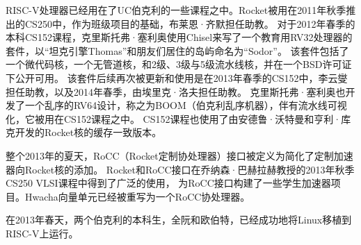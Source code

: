 RISC-V处理器已经用在了UC伯克利的一些课程之中。Rocket被用在2011年秋季推出的CS250中，作为班级项目的基础，布莱恩·齐默担任助教。
对于2012年春季的本科CS152课程，克里斯托弗·塞利奥使用Chisel来写了一个教育用RV32处理器的套件，以“坦克引擎Thomas”和朋友们居住的岛屿命名为“Sodor”。
该套件包括了一个微代码核，一个无管道核，和2级、3级与5级流水线核，并在一个BSD许可证下公开可用。
该套件后续再次被更新和使用是在2013年春季的CS152中，李云燮担任助教，以及2014年春季，由埃里克·洛夫担任助教。
克里斯托弗·塞利奥也开发了一个乱序的RV64设计，称之为BOOM（伯克利乱序机器），伴有流水线可视化，它被用在CS152课程之中。
CS152课程也使用了由安德鲁·沃特曼和亨利·库克开发的Rocket核的缓存一致版本。

整个2013年的夏天，RoCC（Rocket定制协处理器）接口被定义为简化了定制加速器向Rocket核的添加。
Rocket和RoCC接口在乔纳森·巴赫拉赫教授的2013年秋季CS250 VLSI课程中得到了广泛的使用，
为RoCC接口构建了一些学生加速器项目。Hwacha向量单元已经被重写为一个RoCC协处理器。

在2013年春天，两个伯克利的本科生，全阮和欧伯特，已经成功地将Linux移植到RISC-V上运行。

